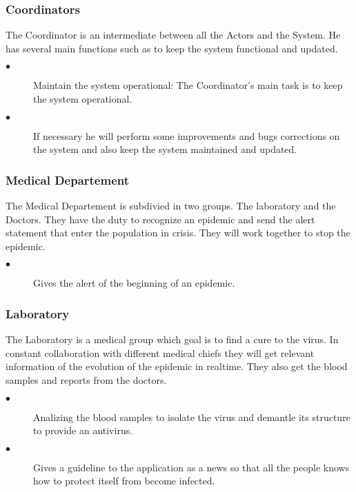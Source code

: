 \subsubsection{Coordinators}
The Coordinator is an intermediate between all the Actors and the System. He has
several main functions such as to keep the system functional and updated.\\
\begin{description}
 \item[$\bullet$] Maintain the system operational: The Coordinator's main task
 is to keep the system operational.
 \item[$\bullet$] If necessary he will perform some improvements and bugs
 corrections on the system and also keep the system maintained and updated.
\end{description} 

\subsubsection{Medical Departement}
The Medical Departement is subdivied in two groups. The laboratory and the
Doctors. They have the duty to recognize an epidemic and send the alert
statement that enter the population in crisis. They will work together to stop
the epidemic.\\
\begin{description}
 \item[$\bullet$] Gives the alert of the beginning of an epidemic.
\end{description} 

\subsubsection{Laboratory}
The Laboratory is a medical group which goal is to find a cure to the virus. In
constant collaboration with different medical chiefs they will get relevant
information of the evolution of the epidemic in realtime. They also get the
blood samples and reports from the doctors.\\
\begin{description}
 \item[$\bullet$] Analizing the blood samples to isolate the virus and demantle
 its structure to provide an antivirus.
 \item[$\bullet$] Gives a guideline to the application as a news so that all the
 people knows how to protect itself from become infected.
\end{description} 


